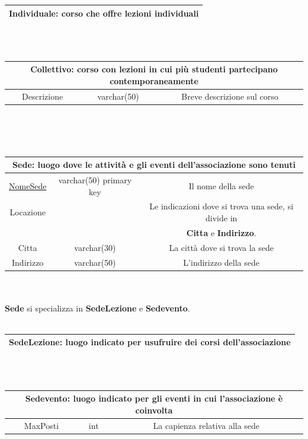 \documentclass[11pt]{article}
\begin{document}
		\begin{tabular}{|c|c|c|}
			\hline
			\multicolumn{3}{|c|}{\textbf{Individuale}: corso che offre lezioni individuali}\\
			\hline
		\end{tabular}
		\\\\
		\begin{tabular}{|c|c|c|}
			\hline
			\multicolumn{3}{|c|}{\textbf{Collettivo}: corso con lezioni in cui più studenti partecipano contemporaneamente}\\
			\hline
			Descrizione & varchar(50) & Breve descrizione sul corso\\
			\hline
		\end{tabular}
		\\\\\\
		\begin{tabular}{|c|c|c|}
			\hline
			\multicolumn{3}{|c|}{\textbf{Sede}: luogo dove le attività e gli eventi dell'associazione sono tenuti}\\
			\hline
			\underline{NomeSede} & varchar(50) primary key & Il nome della sede\\
			\hline
			Locazione &  & Le indicazioni dove si trova una sede, si divide in\\
			&  &\textbf{Citta} e \textbf{Indirizzo}.\\
			Citta & varchar(30) & La città dove si trova la sede\\
			Indirizzo & varchar(50) & L'indirizzo della sede\\
			\hline
		\end{tabular}
		\\\\ \textbf{Sede} si specializza in \textbf{SedeLezione} e \textbf{Sedevento}.\\\\
		\begin{tabular}{|c|c|c|}
			\hline
			\multicolumn{3}{|c|}{\textbf{SedeLezione}: luogo indicato per usufruire dei corsi dell'associazione}\\
			\hline
		\end{tabular}
		\\\\
		\begin{tabular}{|c|c|c|}
			\hline
			\multicolumn{3}{|c|}{\textbf{Sedevento}: luogo indicato per gli eventi in cui l'associazione è coinvolta}\\
			\hline
			MaxPosti & int & La capienza relativa alla sede\\
			\hline
		\end{tabular}
\end{document}
